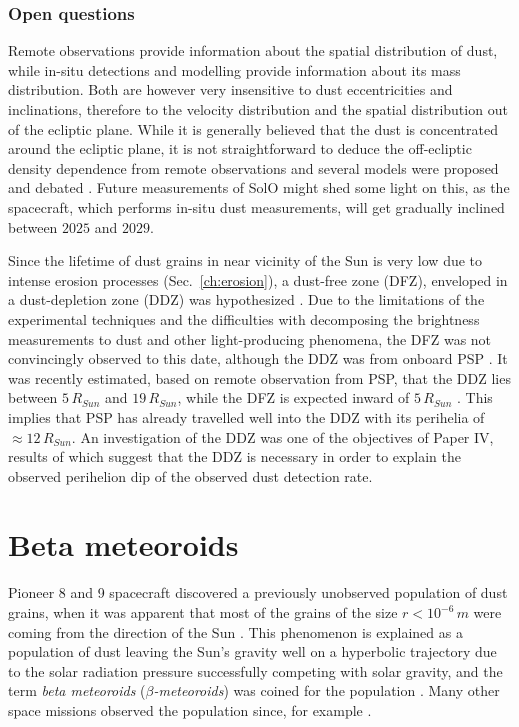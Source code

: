 \subsubsection{Open questions}

Remote observations provide information about the spatial distribution of dust, while in-situ detections and modelling provide information about its mass distribution. Both are however very insensitive to dust eccentricities and inclinations, therefore to the velocity distribution and the spatial distribution out of the ecliptic plane. While it is generally believed that the dust is concentrated around the ecliptic plane, it is not straightforward to deduce the off-ecliptic density dependence from remote observations and several models were proposed and debated \citep{giese1986three}. Future measurements of SolO might shed some light on this, as the spacecraft, which performs in-situ dust measurements, will get gradually inclined between $2025$ and $2029$.

Since the lifetime of dust grains in near vicinity of the Sun is very low due to intense erosion processes (Sec.~\ref{ch:erosion}), a dust-free zone (DFZ), enveloped in a dust-depletion zone (DDZ) was hypothesized \citep{russell1929meteoric}. Due to the limitations of the experimental techniques and the difficulties with decomposing the brightness measurements to dust and other light-producing phenomena, the DFZ was not convincingly observed to this date, although the DDZ was from onboard PSP \cite{stenborg2018characterization}. It was recently estimated, based on remote observation from PSP, that the DDZ lies between $5 \, R_{Sun}$ and $19 \, R_{Sun}$, while the DFZ is expected inward of $5 \, R_{Sun}$ \citep{stenborg2022psp}. This implies that PSP has already travelled well into the DDZ with its perihelia of $\approx 12 \, R_{Sun}$. An investigation of the DDZ was one of the objectives of Paper IV, results of which suggest that the DDZ is necessary in order to explain the observed perihelion dip of the observed dust detection rate.

\section{Beta meteoroids}

Pioneer 8 and 9 spacecraft discovered a previously unobserved population of dust grains, when it was apparent that most of the grains of the size $r < 10^{-6} \, \si{m}$ were coming from the direction of the Sun \citep{berg1973evidence}. This phenomenon is explained as a population of dust leaving the Sun's gravity well on a hyperbolic trajectory due to the solar radiation pressure successfully competing with solar gravity, and the term \textit{beta meteoroids} ($\beta$\textit{-meteoroids}) was coined for the population \citep{zook1975source}. Many other space missions observed the population since, for example \cite{zaslavsky2012interplanetary,malaspina2014interplanetary,zaslavsky2021first}.

